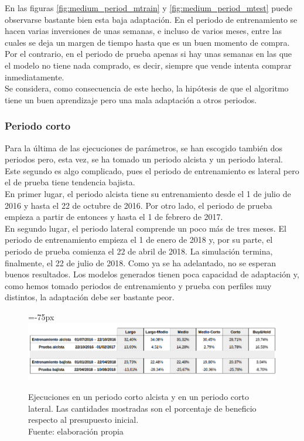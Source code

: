 En las figuras \ref{fig:medium_period_mtrain} y \ref{fig:medium_period_mtest} puede observarse bastante bien esta baja adaptaci\'on. En el periodo de entrenamiento se hacen varias inversiones de unas semanas, e incluso de varios meses, entre las cuales se deja un margen de tiempo hasta que es un buen momento de compra. Por el contrario, en el periodo de prueba apenas si hay unas semanas en las que el modelo no tiene nada comprado, es decir, siempre que vende intenta comprar inmediatamente.\\

Se considera, como consecuencia de este hecho, la hip\'otesis de que el algoritmo tiene un buen aprendizaje pero una mala adaptaci\'on a otros periodos.\\

     	
\subsubsection{Periodo corto}

Para la \'ultima de las ejecuciones de par\'ametros, se han escogido tambi\'en dos periodos pero, esta vez, se ha tomado un periodo alcista y un periodo lateral. Este segundo es algo complicado, pues el periodo de entrenamiento es lateral pero el de prueba tiene tendencia bajista. \\

En primer lugar, el periodo alcista tiene su entrenamiento desde el 1 de julio de 2016 y hasta el 22 de octubre de 2016. Por otro lado, el periodo de prueba empieza a partir de entonces y hasta el 1 de febrero de 2017.\\

En segundo lugar, el periodo lateral comprende un poco m\'as de tres meses. El periodo de entrenamiento empieza el 1 de enero de 2018 y, por su parte, el periodo de prueba comienza el 22 de abril de 2018. La simulaci\'on termina, finalmente, el 22 de julio de 2018. Como ya se ha adelantado, no se esperan buenos resultados. Los modelos generados tienen poca capacidad de adaptaci\'on y, como hemos tomado periodos de entrenamiento y prueba con perfiles muy distintos, la adaptaci\'on debe ser bastante peor.\\

     	\begin{figure}[H]
     		\centering\leftskip=-75px
     		\includegraphics[scale=0.60]{imagenes/Short_period.png}
     		\caption[Ejecuciones en un periodo corto alcista y en un periodo corto lateral]{Ejecuciones en un periodo corto alcista y en un periodo corto lateral. Las cantidades mostradas son el porcentaje de beneficio respecto al presupuesto inicial.\\ Fuente: elaboraci\'on propia}
     		\label{fig:short_period}
     	\end{figure}

